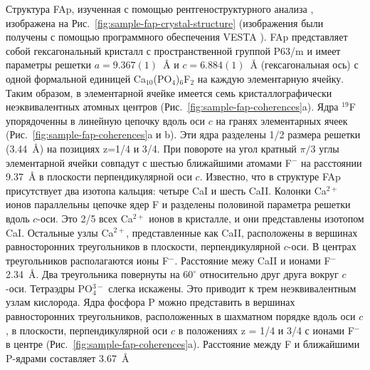 Структура FAp, изученная с помощью рентгеноструктурного анализа \cite{Elliott1994}, изображена на Рис.~\ref{fig:sample-fap-crystal-structure} (изображения были получены с помощью программного обеспечения VESTA \cite{vesta}).
FAp представляет собой гексагональный кристалл с пространственной группой P63/m
и имеет параметры решетки $a=9.367(1)$~\r{A} и $c=6.884(1)$~\r{A}
(гексагональная ось) с одной формальной единицей Ca$_{10}$(PO$_4$)$_6$F$_2$ на каждую элементарную ячейку.
Таким образом, в элементарной ячейке имеется семь кристаллографически неэквивалентных атомных центров (Рис.~\ref{fig:sample-fap-coherences}a).
Ядра $^{19}$F упорядоченны в линейную цепочку вдоль оси $c$ на гранях элементарных ячеек (Рис.~\ref{fig:sample-fap-coherences}a и b). 
Эти ядра разделены 1/2 размера решетки (3.44~\r{A}) на позициях z=1/4 и 3/4. 
При повороте на угол кратный $\pi/3$ углы элементарной ячейки совпадут с шестью ближайшими атомами F$^-$ на расстоянии 9.37~\r{A}  в плоскости перпендикулярной оси $c$.
Известно, что в структуре FAp присутствует два изотопа кальция: четыре CaI и шесть CaII. 
Колонки Ca$^{2+}$ ионов параллельны цепочке ядер F и разделены половиной параметра решетки вдоль $c$-оси. 
Это 2/5 всех Ca$^{2+}$ ионов в кристалле, и они представлены изотопом CaI. 
Остальные узлы Ca$^{2+}$, представленные как CaII, расположены в вершинах равносторонних треугольников в плоскости, перпендикулярной $c$-оси. 
В центрах треугольников располагаются ионы F$^-$. 
Расстояние межу CaII и ионами F$^-$ 2.34~\r{A}. 
Два треугольника повернуты на $60^\circ$ относительно друг друга вокруг $c$-оси. 
Тетраэдры PO$_4^{3-}$ слегка искажены. 
Это приводит к трем неэквивалентным узлам кислорода. 
Ядра фосфора P можно представить в вершинах равносторонних треугольников, 
расположенных в шахматном порядке вдоль оси $c$, 
в плоскости, 
перпендикулярной оси $c$ в положениях z = 1/4 и 3/4 с ионами F$^-$ в центре (Рис.~\ref{fig:sample-fap-coherences}a).
Расстояние между F и ближайшими P-ядрами составляет 3.67~\r{A}

